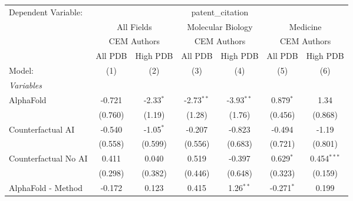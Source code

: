 \begingroup
\centering
\begin{tabular}{lcccccc}
   \tabularnewline \midrule \midrule
   Dependent Variable: & \multicolumn{6}{c}{patent\_citation}\\
 & \multicolumn{2}{c}{All Fields} & \multicolumn{2}{c}{Molecular Biology} & \multicolumn{2}{c}{Medicine} \\
\cmidrule(lr){2-3} \cmidrule(lr){4-5} \cmidrule(lr){6-7}
 & \multicolumn{2}{c}{CEM Authors} & \multicolumn{2}{c}{CEM Authors} & \multicolumn{2}{c}{CEM Authors} \\
\cmidrule(lr){2-3} \cmidrule(lr){4-5} \cmidrule(lr){6-7}
 & \multicolumn{1}{c}{All PDB} & \multicolumn{1}{c}{High PDB} & \multicolumn{1}{c}{All PDB} & \multicolumn{1}{c}{High PDB} & \multicolumn{1}{c}{All PDB} & \multicolumn{1}{c}{High PDB} \\
\cmidrule(lr){2-2} \cmidrule(lr){3-3} \cmidrule(lr){4-4} \cmidrule(lr){5-5} \cmidrule(lr){6-6} \cmidrule(lr){7-7}
   Model:                                                     & (1)           & (2)           & (3)            & (4)           & (5)           & (6)\\  
   \midrule
   \emph{Variables}\\
   AlphaFold                                                  & -0.721        & -2.33$^{*}$   & -2.73$^{**}$   & -3.93$^{**}$  & 0.879$^{*}$   & 1.34\\   
                                                              & (0.760)       & (1.19)        & (1.28)         & (1.76)        & (0.456)       & (0.868)\\   
   Counterfactual AI                                          & -0.540        & -1.05$^{*}$   & -0.207         & -0.823        & -0.494        & -1.19\\   
                                                              & (0.558)       & (0.599)       & (0.556)        & (0.683)       & (0.721)       & (0.801)\\   
   Counterfactual No AI                                       & 0.411         & 0.040         & 0.519          & -0.397        & 0.629$^{*}$   & 0.454$^{***}$\\   
                                                              & (0.298)       & (0.382)       & (0.446)        & (0.648)       & (0.323)       & (0.159)\\   
   AlphaFold - Method                                         & -0.172        & 0.123         & 0.415          & 1.26$^{**}$   & -0.271$^{*}$  & 0.199\\   

\end{tabular}
